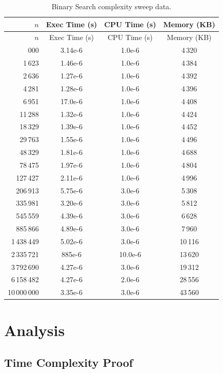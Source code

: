 \documentclass[12pt,a4paper]{report}
\begin{document}
\begin{longtable}{rSSS}
\caption{Binary Search complexity sweep data.}
\label{tab:binary}\\
\toprule
$n$ & {Exec Time (s)} & {CPU Time (s)} & {Memory (KB)} \\
\midrule
\endfirsthead
\toprule
$n$ & {Exec Time (s)} & {CPU Time (s)} & {Memory (KB)} \\
\midrule
\endhead
\bottomrule
{}\,000 & 3.14e-6  & 1.0e-6  &  4\,320 \\
       1\,623 & 1.46e-6  & 1.0e-6  &  4\,384 \\
       2\,636 & 1.27e-6  & 1.0e-6  &  4\,392 \\
       4\,281 & 1.28e-6  & 1.0e-6  &  4\,396 \\
       6\,951 & 17.0e-6  & 1.0e-6  &  4\,408 \\
      11\,288 & 1.32e-6  & 1.0e-6  &  4\,424 \\
      18\,329 & 1.39e-6  & 1.0e-6  &  4\,452 \\
      29\,763 & 1.55e-6  & 1.0e-6  &  4\,496 \\
      48\,329 & 1.81e-6  & 1.0e-6  &  4\,688 \\
      78\,475 & 1.97e-6  & 1.0e-6  &  4\,804 \\
     127\,427 & 2.11e-6  & 1.0e-6  &  4\,996 \\
     206\,913 & 5.75e-6  & 3.0e-6  &  5\,308 \\
     335\,981 & 3.20e-6  & 3.0e-6  &  5\,812 \\
     545\,559 & 4.39e-6  & 3.0e-6  &  6\,628 \\
     885\,866 & 4.89e-6  & 3.0e-6  &  7\,960 \\
   1\,438\,449 & 5.02e-6  & 3.0e-6  & 10\,116 \\
   2\,335\,721 & 885e-6   & 10.0e-6 & 13\,620 \\
   3\,792\,690 & 4.27e-6  & 3.0e-6  & 19\,312 \\
   6\,158\,482 & 4.27e-6  & 2.0e-6  & 28\,556 \\
  10\,000\,000 & 3.35e-6  & 3.0e-6  & 43\,560 \\
\end{longtable}

\section{Analysis}

\subsection{Time Complexity Proof}
\end{document}
